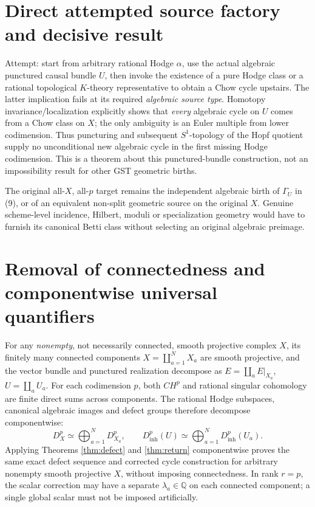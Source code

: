 \documentclass[11pt]{article}
\begin{document}
\section{Direct attempted source factory and decisive result}
Attempt: start from arbitrary rational Hodge $\alpha$, use the
actual algebraic punctured causal bundle $U$, then invoke
the existence of a pure Hodge class or a rational topological
$K$-theory representative to obtain a Chow cycle upstairs.
The latter implication fails at its required \emph{algebraic
source type}. Homotopy invariance/localization explicitly
shows that \emph{every} algebraic cycle on $U$ comes from a
Chow class on $X$; the only ambiguity is an Euler multiple
from lower codimension. Thus puncturing and subsequent
$S^1$-topology of the Hopf quotient supply no unconditional
new algebraic cycle in the first missing Hodge codimension.
This is a theorem about this punctured-bundle construction,
not an impossibility result for other GST geometric births.

The original all-$X$, all-$p$ target remains the independent
algebraic birth of $\Gamma_U$ in (9), or of an equivalent
non-split geometric source on the original $X$. Genuine
scheme-level incidence, Hilbert, moduli or specialization
geometry would have to furnish its canonical Betti class
without selecting an original algebraic preimage.

\section{Removal of connectedness and componentwise universal quantifiers}
For any \emph{nonempty}, not necessarily connected, smooth projective
complex $X$, its finitely many connected components
$X=\coprod_{a=1}^N X_a$ are smooth projective, and the vector
bundle and punctured realization decompose as
$E=\coprod_a E|_{X_a}$, $U=\coprod_a U_a$.
For each codimension $p$, both $CH^p$ and rational singular
cohomology are finite direct sums across components.
The rational Hodge subspaces, canonical algebraic images and
defect groups therefore decompose componentwise:
\[
  D_X^p\simeq\bigoplus_{a=1}^N D_{X_a}^p,\qquad
  D_{\mathrm{inh}}^p(U)\simeq
    \bigoplus_{a=1}^N D_{\mathrm{inh}}^p(U_a).
\]
Applying Theorems \ref{thm:defect} and \ref{thm:return}
componentwise proves the same exact defect sequence and
corrected cycle construction for arbitrary nonempty smooth
projective $X$, without imposing connectedness.
In rank $r=p$, the scalar correction may have a separate
$\lambda_a\in\mathbb Q$ on each connected component;
a single global scalar must not be imposed artificially.
\end{document}
